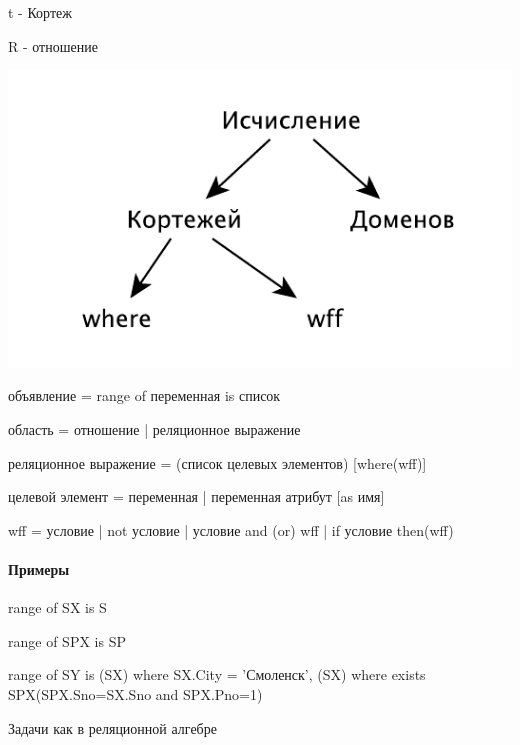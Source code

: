 \documentclass[a4paper, 14pt]{report}
\begin{document}
t - Кортеж

R - отношение

\begin{center}
    \includegraphics{db1}
\end{center}

объявление = range of переменная is список

область = отношение | реляционное выражение

реляционное выражение = (список целевых элементов) [where(wff)]

целевой элемент = переменная | переменная атрибут [as имя]

wff = условие | not условие | условие and (or) wff | if условие then(wff)

\paragraph{Примеры}

\hfill

range of SX is S

range of SPX is SP

range of SY is (SX) where SX.City = 'Смоленск', (SX) where exists SPX(SPX.Sno=SX.Sno and SPX.Pno=1)

Задачи как в реляционной алгебре
\end{document}
